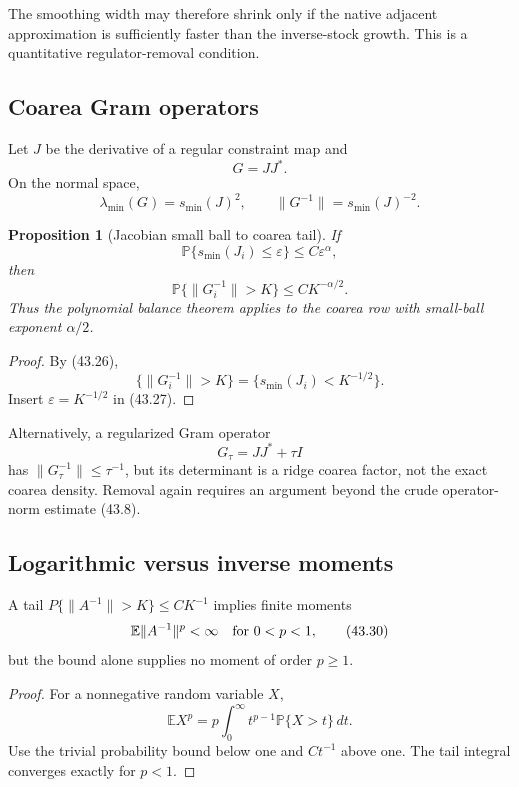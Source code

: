 \documentclass[11pt]{article}
\newtheorem{proposition}[theorem]{Proposition}
\begin{document}
The smoothing width may therefore shrink only if the native adjacent
approximation is sufficiently faster than the inverse-stock growth.
This is a quantitative regulator-removal condition.

\subsection{Coarea Gram operators}

Let \(J\) be the derivative of a regular constraint map and
\[
 G=JJ^*.
 \tag{43.25}
\]
On the normal space,
\[
 \lambda_{\min}(G)=s_{\min}(J)^2,
 \qquad
 \|G^{-1}\|=s_{\min}(J)^{-2}.
 \tag{43.26}
\]

\begin{proposition}[Jacobian small ball to coarea tail]
\label{prop:v11v43-coarea}
If
\[
 \mathbb P\{s_{\min}(J_i)\leq\varepsilon\}
 \leq C\varepsilon^\alpha,
 \tag{43.27}
\]
then
\[
 \mathbb P\{\|G_i^{-1}\|>K\}
 \leq CK^{-\alpha/2}.
 \tag{43.28}
\]
Thus the polynomial balance theorem applies to the coarea row with
small-ball exponent \(\alpha/2\).
\end{proposition}

\begin{proof}
By (43.26),
\[
 \{\|G_i^{-1}\|>K\}
 =
 \{s_{\min}(J_i)<K^{-1/2}\}.
\]
Insert \(\varepsilon=K^{-1/2}\) in (43.27).
\end{proof}

Alternatively, a regularized Gram operator
\[
 G_\tau=JJ^*+\tau I
 \tag{43.29}
\]
has \(\|G_\tau^{-1}\|\leq\tau^{-1}\), but its determinant is a ridge
coarea factor, not the exact coarea density.  Removal again requires an
argument beyond the crude operator-norm estimate (43.8).

\subsection{Logarithmic versus inverse moments}

A tail \(P\{\|A^{-1}\|>K\}\leq CK^{-1}\) implies finite moments
\[
 \mathbb E\|A^{-1}\|^p<\infty
 \quad\hbox{for }0<p<1,
 \tag{43.30}
\]
but the bound alone supplies no moment of order \(p\geq1\).

\begin{proof}
For a nonnegative random variable \(X\),
\[
 \mathbb EX^p
 =
 p\int_0^\infty t^{p-1}\mathbb P\{X>t\}\,dt.
\]
Use the trivial probability bound below one and \(Ct^{-1}\) above one.
The tail integral converges exactly for \(p<1\).
\end{proof}
\end{document}
